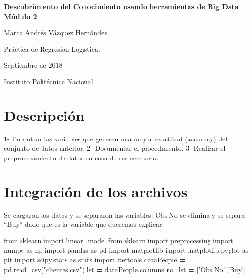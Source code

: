 \documentclass[]{article}
\title{}
\author{}
\date{}
\newenvironment{Shaded}{\begin{snugshade}}{\end{snugshade}}
\newcommand{\StringTok}[1]{\textcolor[rgb]{0.31,0.60,0.02}{#1}}
\newcommand{\ImportTok}[1]{#1}
\newcommand{\OperatorTok}[1]{\textcolor[rgb]{0.81,0.36,0.00}{\textbf{#1}}}
\newcommand{\NormalTok}[1]{#1}
\begin{document}
\begin{centering}

\vspace*{5 cm}

\Huge

{\bf Descubrimiento del Conocimiento usando herramientas de Big Data Módulo 2}

\vspace{3 cm}

\Large
Marco Andrés Vázquez Hernández

\vspace{1 cm}
\normalsize
Práctica de Regresion Logística. 

Septiembre de 2018

\normalsize
Instituto Politécnico Nacional


\end{centering}

\newpage

\section{Descripción}\label{descripcion}

1- Encontrar las variables que generen una mayor exactitud (accuracy)
del conjunto de datos anterior. 2- Documentar el procedmiento. 3-
Realizar el preprocesamiento de datos en caso de ser necesario.

\section{Integración de los archivos}\label{integracion-de-los-archivos}

Se cargaron los datos y se separaron las variables: Obs.No se elimina y
se separa ``Buy'' dado que es la variable que queremos explicar.

\begin{Shaded}
\begin{Highlighting}[]
\ImportTok{from}\NormalTok{ sklearn }\ImportTok{import}\NormalTok{ linear_model}
\ImportTok{from}\NormalTok{ sklearn }\ImportTok{import}\NormalTok{ preprocessing}
\ImportTok{import}\NormalTok{ numpy }\ImportTok{as}\NormalTok{ np}
\ImportTok{import}\NormalTok{ pandas }\ImportTok{as}\NormalTok{ pd}
\ImportTok{import}\NormalTok{ matplotlib}
\ImportTok{import}\NormalTok{ matplotlib.pyplot }\ImportTok{as}\NormalTok{ plt}
\ImportTok{import}\NormalTok{ scipy.stats }\ImportTok{as}\NormalTok{ stats}
\ImportTok{import}\NormalTok{ itertools}
\NormalTok{dataPeople }\OperatorTok{=}\NormalTok{ pd.read_csv(}\StringTok{"clientes.csv"}\NormalTok{)}
\NormalTok{lst }\OperatorTok{=}\NormalTok{ dataPeople.columns}
\NormalTok{no_lst }\OperatorTok{=}\NormalTok{ [}\StringTok{'Obs No.'}\NormalTok{,}\StringTok{'Buy'}\NormalTok{]}
\end{Highlighting}
\end{Shaded}
\end{document}
